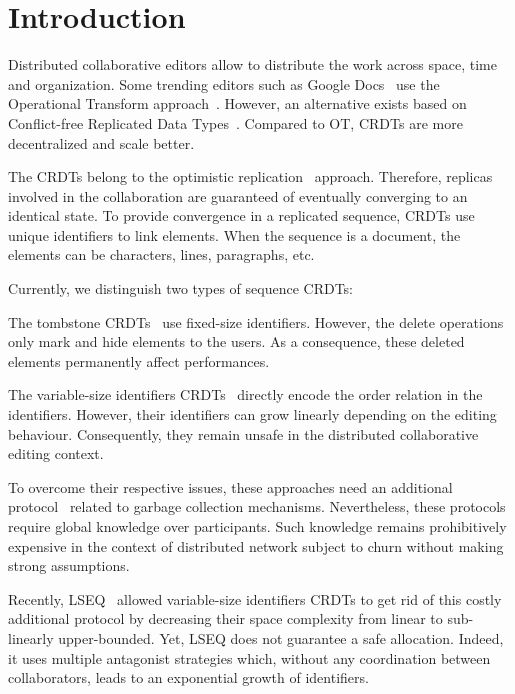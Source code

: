 
\section{Introduction}

Distributed collaborative editors allow to distribute the work across space,
time and organization. Some trending editors such as Google
Docs~\cite{nichols1995high} use the Operational Transform
approach~\cite{sun1998operational,sun1998achieving}. However, an alternative
exists based on Conflict-free Replicated Data
Types~\cite{shapiro2011comprehensive,shapiro2011conflict}.  Compared to OT,
CRDTs are more decentralized and scale better.

The CRDTs belong to the optimistic
replication~\cite{saito2002replication,saito2005optimistic}
approach. Therefore, replicas involved in the collaboration are guaranteed of
eventually converging to an identical state. To provide convergence in a
replicated sequence, CRDTs use unique identifiers to link elements. When the
sequence is a document, the elements can be characters, lines, paragraphs, etc.


Currently, we distinguish two types of sequence CRDTs:
\begin{inparaenum}[(i)]
\item The tombstone
  CRDTs~\cite{ahmed2011evaluating,grishchenko2010deep,oster2006data,preguica2009commutative,roh2011replicated,weiss2007wooki,wu2010partial,Yu2012stringwise}
  use fixed-size identifiers. However, the delete operations only mark and hide
  elements to the users. As a consequence, these deleted elements permanently
  affect performances.
\item The variable-size identifiers
  CRDTs~\cite{preguica2009commutative,weiss2009logoot} directly encode the
  order relation in the identifiers. However, their identifiers can grow
  linearly depending on the editing behaviour. Consequently, they remain unsafe
  in the distributed collaborative editing context.
\end{inparaenum}

To overcome their respective issues, these approaches need an additional
protocol~\cite{letia2009crdts,roh2011replicated} related to garbage collection
mechanisms. Nevertheless, these protocols require global knowledge over
participants. Such knowledge remains prohibitively expensive in the context of
distributed network subject to churn without making strong assumptions.

Recently, LSEQ~\cite{nedelec2013lseq} allowed variable-size identifiers CRDTs
to get rid of this costly additional protocol by decreasing their space
complexity from linear to sub-linearly upper-bounded. Yet, LSEQ does not
guarantee a safe allocation. Indeed, it uses multiple antagonist strategies
which, without any coordination between collaborators, leads to an exponential
growth of identifiers.

